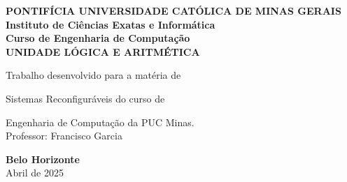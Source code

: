 





\begin{titlepage}
    \centering
    {\large\textbf{PONTIFÍCIA UNIVERSIDADE CATÓLICA DE MINAS GERAIS}}\\[0.5cm]
    {\large\textbf{Instituto de Ciências Exatas e Informática}}\\[0.2cm]
    {\large\textbf{Curso de Engenharia de Computação}}\\[6cm]

    {\Large\bfseries UNIDADE LÓGICA E ARITMÉTICA}\\[3cm]

    \begin{flushright}
    Trabalho desenvolvido para a matéria de 
    
    Sistemas Reconfiguráveis do curso de 
    
    Engenharia de Computação da PUC Minas.\\[0.8cm]

    Professor: Francisco Garcia
    \end{flushright}

    \vfill
    \textbf{Belo Horizonte}\\
    Abril de 2025
\end{titlepage}


